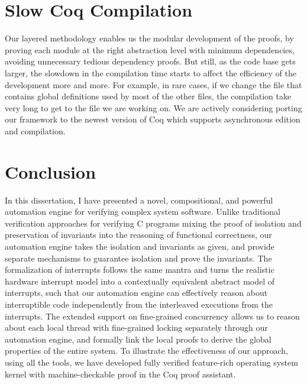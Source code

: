 \section{Slow Coq Compilation}
Our layered methodology enables us the modular development of the proofs, by proving
each module at the right abstraction level with minimum dependencies, avoiding unnecessary
tedious dependency proofs. But still, as the code base gets larger, the slowdown
in the compilation time starts to affect the efficiency of the development more and more.
For example, in rare cases, if we change the file that contains global definitions used by
most of the other files, the compilation take very long to get to the file we are working on.
We are actively considering porting our framework to the newest version of Coq which supports
asynchronous edition and compilation.

\section{Conclusion}
In this dissertation, I have presented a novel, compositional, and powerful
automation engine for verifying complex system software.
Unlike traditional verification approaches for verifying C programs mixing 
the proof of isolation and preservation of invariants into the reasoning of 
functional correctness, our automation engine takes the isolation and 
invariants as given, and provide separate mechanisms to guarantee 
isolation and prove the invariants.
The formalization of interrupts follows the
same mantra and turns the realistic hardware interrupt model into
a contextually equivalent abstract model of interrupts,
such that our automation engine can effectively reason about interruptible
code independently from the interleaved executions from the interrupts.
The extended support on fine-grained concurrency allows us
to reason about each local thread with fine-grained locking separately through
our automation engine,
and formally link the local proofs to derive the global properties of
the entire system. 
To illustrate the effectiveness of our approach, using all the tools, we 
have developed fully verified feature-rich operating system kernel 
with machine-checkable proof in the Coq proof assistant.

